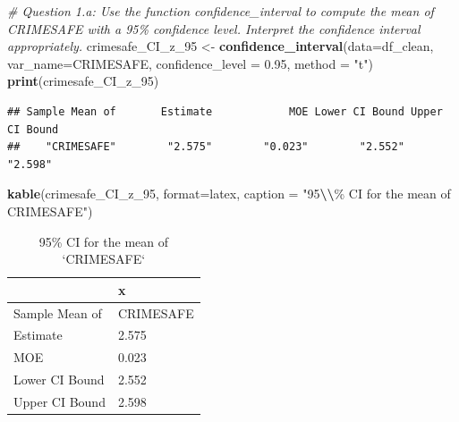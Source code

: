 \documentclass[
  11pt,
]{article}
\newenvironment{Shaded}{\begin{snugshade}}{\end{snugshade}}
\newcommand{\AttributeTok}[1]{\textcolor[rgb]{0.13,0.29,0.53}{#1}}
\newcommand{\CommentTok}[1]{\textcolor[rgb]{0.56,0.35,0.01}{\textit{#1}}}
\newcommand{\FloatTok}[1]{\textcolor[rgb]{0.00,0.00,0.81}{#1}}
\newcommand{\FunctionTok}[1]{\textcolor[rgb]{0.13,0.29,0.53}{\textbf{#1}}}
\newcommand{\NormalTok}[1]{#1}
\newcommand{\OtherTok}[1]{\textcolor[rgb]{0.56,0.35,0.01}{#1}}
\newcommand{\SpecialCharTok}[1]{\textcolor[rgb]{0.81,0.36,0.00}{\textbf{#1}}}
\newcommand{\StringTok}[1]{\textcolor[rgb]{0.31,0.60,0.02}{#1}}
\begin{document}
\begin{Shaded}
\begin{Highlighting}[]
\CommentTok{\# Question 1.a: Use the function \textasciigrave{}confidence\_interval\textasciigrave{} to compute the mean of \textasciigrave{}CRIMESAFE\textasciigrave{} with a 95\% confidence level. Interpret the confidence interval appropriately.}
\NormalTok{crimesafe\_CI\_z\_95 }\OtherTok{\textless{}{-}} \FunctionTok{confidence\_interval}\NormalTok{(}\AttributeTok{data=}\NormalTok{df\_clean, }
                                         \AttributeTok{var\_name=}\StringTok{\textquotesingle{}CRIMESAFE\textquotesingle{}}\NormalTok{, }
                                         \AttributeTok{confidence\_level =} \FloatTok{0.95}\NormalTok{, }\AttributeTok{method =} \StringTok{"t"}\NormalTok{)}
\FunctionTok{print}\NormalTok{(crimesafe\_CI\_z\_95)}
\end{Highlighting}
\end{Shaded}

\begin{verbatim}
## Sample Mean of       Estimate            MOE Lower CI Bound Upper CI Bound 
##    "CRIMESAFE"        "2.575"        "0.023"        "2.552"        "2.598"
\end{verbatim}

\begin{Shaded}
\begin{Highlighting}[]
\FunctionTok{kable}\NormalTok{(crimesafe\_CI\_z\_95, }\AttributeTok{format=}\StringTok{\textquotesingle{}latex\textquotesingle{}}\NormalTok{, }\AttributeTok{caption =} \StringTok{"95}\SpecialCharTok{\textbackslash{}\textbackslash{}}\StringTok{\% CI for the mean of \textasciigrave{}CRIMESAFE\textasciigrave{}"}\NormalTok{)}
\end{Highlighting}
\end{Shaded}

\begin{table}

\caption{\label{tab:q1-a}95\% CI for the mean of `CRIMESAFE`}
\centering
\begin{tabular}[t]{l|l}
\hline
  & x\\
\hline
Sample Mean of & CRIMESAFE\\
\hline
Estimate & 2.575\\
\hline
MOE & 0.023\\
\hline
Lower CI Bound & 2.552\\
\hline
Upper CI Bound & 2.598\\
\hline
\end{tabular}
\end{table}
\end{document}
